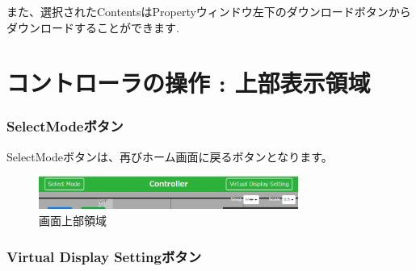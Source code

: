 \documentclass[a4paper,10pt,oneside]{jsbook}
\begin{document}
また、選択されたContentsはPropertyウィンドウ左下のダウンロードボタンから
ダウンロードすることができます.\\


\clearpage 



\chapter{コントローラの操作 : 上部表示領域}
\subsection{SelectModeボタン}
SelectModeボタンは、再びホーム画面に戻るボタンとなります。

\begin{figure}[htbp]
	\begin{center}
		\includegraphics[width=8.5cm]{image/Upper.PNG}
	\end{center}
	\caption{画面上部領域}
	\label{fig:upperarea}
\end{figure}


\subsection{Virtual Display Settingボタン}
\end{document}
